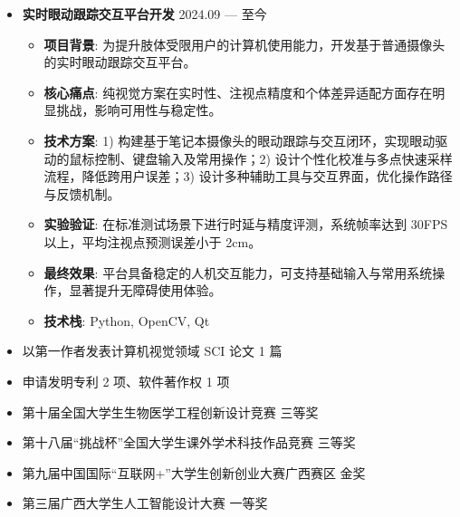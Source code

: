 \documentclass[zh]{resume}
\begin{document}
\begin{itemize}
    \item \textbf{实时眼动跟踪交互平台开发} \hfill 2024.09 --- 至今
    \begin{itemize}
      \item \textbf{项目背景}: 为提升肢体受限用户的计算机使用能力，开发基于普通摄像头的实时眼动跟踪交互平台。
      \item \textbf{核心痛点}: 纯视觉方案在实时性、注视点精度和个体差异适配方面存在明显挑战，影响可用性与稳定性。
      \item \textbf{技术方案}: 1) 构建基于笔记本摄像头的眼动跟踪与交互闭环，实现眼动驱动的鼠标控制、键盘输入及常用操作；2) 设计个性化校准与多点快速采样流程，降低跨用户误差；3) 设计多种辅助工具与交互界面，优化操作路径与反馈机制。
      \item \textbf{实验验证}: 在标准测试场景下进行时延与精度评测，系统帧率达到 30FPS 以上，平均注视点预测误差小于 2cm。
      \item \textbf{最终效果}: 平台具备稳定的人机交互能力，可支持基础输入与常用系统操作，显著提升无障碍使用体验。
      \item \textbf{技术栈}: Python, OpenCV, Qt
    \end{itemize}
\end{itemize}

\begin{itemize}
  \item 以第一作者发表计算机视觉领域 SCI 论文 1 篇
  \item 申请发明专利 2 项、软件著作权 1 项
  \item 第十届全国大学生生物医学工程创新设计竞赛 三等奖
  \item 第十八届“挑战杯”全国大学生课外学术科技作品竞赛 三等奖
  \item 第九届中国国际“互联网+”大学生创新创业大赛广西赛区 金奖
  \item 第三届广西大学生人工智能设计大赛 一等奖
\end{itemize}
\end{document}
